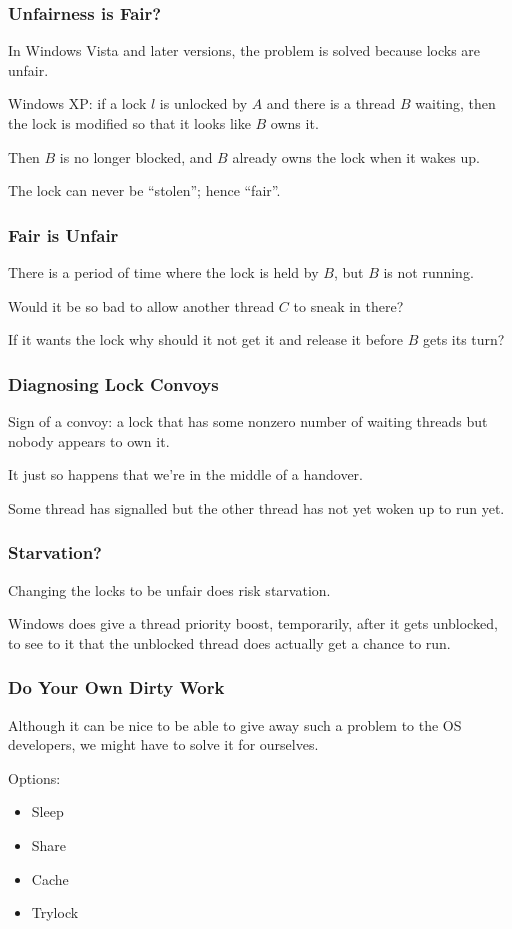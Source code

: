 \begin{frame}
\frametitle{Unfairness is Fair?}

In Windows Vista and later versions, the problem is solved because locks are unfair. 

Windows XP: if a lock $l$ is unlocked by $A$ and there is a thread $B$ waiting, then the lock is modified so that it looks like $B$ owns it.

Then $B$ is no longer blocked, and $B$ already owns the lock when it wakes up.

The lock can never be ``stolen''; hence ``fair''.

\end{frame}

\begin{frame}
\frametitle{Fair is Unfair}

There is a period of time where the lock is held by $B$, but $B$ is not running.

Would it be so bad to allow another thread $C$ to sneak in there?

If it wants the lock why should it not get it and release it before $B$ gets its turn?

\end{frame}

\begin{frame}
\frametitle{Diagnosing Lock Convoys}

Sign of a convoy: a lock that has some nonzero number of waiting threads but nobody appears to own it. 

It just so happens that we're in the middle of a handover. 

Some thread has signalled but the other thread has not yet woken up to run yet.


\end{frame}

\begin{frame}
\frametitle{Starvation?}

Changing the locks to be unfair does risk starvation. 

Windows does give a thread priority boost, temporarily, after it gets unblocked, to see to it that the unblocked thread does actually get a chance to run.

\end{frame}

\begin{frame}
\frametitle{Do Your Own Dirty Work}

Although it can be nice to be able to give away such a problem to the OS developers, we might have to solve it for ourselves. 

Options:

\begin{itemize}
	\item Sleep
	\item Share
	\item Cache
	\item Trylock
\end{itemize}

\end{frame}
 

